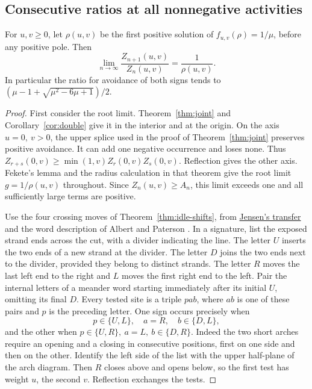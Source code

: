 \subsection*{Consecutive ratios at all nonnegative activities}
\begin{theorem}\label{thm:all-weighted-ratios}
For \(u,v\ge0\), let \(\rho(u,v)\) be the first positive solution of
\(f_{u,v}(\rho)=1/\mu\), before any positive pole. Then
\[
       \lim_{n\to\infty}\frac{Z_{n+1}(u,v)}{Z_n(u,v)}
                 =\frac{1}{\rho(u,v)} .
\]
In particular the ratio for avoidance of both signs tends to
\((\mu-1+\sqrt{\mu^2-6\mu+1})/2\).
\end{theorem}
\begin{proof}
First consider the root limit. Theorem~\ref{thm:joint} and
Corollary~\ref{cor:double} give it in the interior and at the origin.
On the axis \(u=0,\ v>0\), the upper splice used in the proof of
Theorem~\ref{thm:joint} preserves positive avoidance. It can add one
negative occurrence and loses none. Thus
\(Z_{r+s}(0,v)\ge\min(1,v)Z_r(0,v)Z_s(0,v)\).
Reflection gives the other axis. Fekete's lemma and the radius
calculation in that theorem give the root limit \(g=1/\rho(u,v)\)
throughout. Since \(Z_n(u,v)\ge A_n\), this limit exceeds one and
all sufficiently large terms are positive.

Use the four crossing moves of Theorem~\ref{thm:idle-shifts},
from \href{https://arxiv.org/pdf/cond-mat/0008178#page=7}{Jensen's
transfer} and the word description of Albert and Paterson \cite{AP}.
In a signature, list the exposed strand ends across the cut, with a
divider indicating the line. The letter \(U\) inserts the two ends of a
new strand at the divider. The letter \(D\) joins the two ends next to
the divider, provided they belong to distinct strands. The letter \(R\)
moves the last left end to the right and \(L\) moves the first right
end to the left. Pair the internal letters of a meander word starting
immediately after its initial \(U\), omitting its final \(D\).
Every tested site is a triple \(pab\), where \(ab\) is one of these
pairs and \(p\) is the preceding letter. One sign occurs precisely when
\[
         p\in\{U,L\},\quad a=R,\quad b\in\{D,L\},
\]
and the other when \(p\in\{U,R\},\ a=L,\ b\in\{D,R\}\).
Indeed the two short arches require an opening and a closing in
consecutive positions, first on one side and then on the other.
Identify the left side of the list with the upper half-plane of
the arch diagram. Then \(R\) closes above and opens below, so the
first test has weight \(u\), the second \(v\). Reflection exchanges
the tests.


\end{proof}
